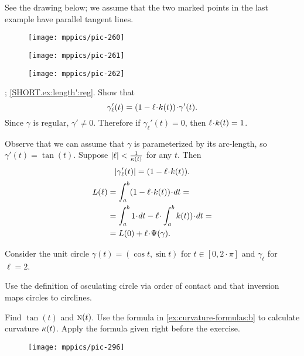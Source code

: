 See the drawing below; we assume that the two marked points in the last example have parallel tangent lines.

\begin{figure}[h!]
\begin{minipage}{.32\textwidth}
\centering
\texttt{[image: mppics/pic-260]}
\end{minipage}\hfill
\begin{minipage}{.32\textwidth}
\centering
\texttt{[image: mppics/pic-261]}
\end{minipage}
\hfill
\begin{minipage}{.32\textwidth}
\centering
\texttt{[image: mppics/pic-262]}
\end{minipage}
\end{figure}

\parbf{\ref{ex:length'}}; \ref{SHORT.ex:length':reg}.
Show that
\[
\gamma_\ell'(t)=(1-\ell\cdot\skur(t))\cdot \gamma'(t).
\]
Since $\gamma$ is regular, $\gamma'\ne0$.
Therefore if $\gamma_\ell'(t)=0$, then $\ell\cdot \skur(t)= 1$.

 Observe that we can assume that $\gamma$ is parameterized by its arc-length, so $\gamma'(t)=\tan(t)$.
Suppose $|\ell|<\frac{1}{\kappa(t)}$ for any $t$.
Then 
\[
|\gamma_\ell'(t)|=(1-\ell\cdot\skur(t)).
\]
\begin{align*}
L(\ell)
&=
\int_a^b(1-\ell\cdot\skur(t))\cdot dt=
\\
&=
\int_a^b 1\cdot dt-\ell\cdot \int_a^b\skur(t))\cdot dt=
\\
&=L(0)+\ell\cdot\Psi(\gamma).
\end{align*}



Consider the unit circle $\gamma(t)=(\cos t,\sin t)$ for $t\in[0,2\cdot\pi]$ and $\gamma_\ell$ for $\ell=2$.

Use the definition of osculating circle via order of contact and that inversion maps circles to circlines. 

Find $\tan(t)$ and $\textsc{n}(t)$.
Use the formula in \ref{ex:curvature-formulas:b} to calculate curvature $\kappa(t)$.
Apply the formula given right before the exercise.

\begin{wrapfigure}{r}{15 mm}
\vskip-0mm
\centering
\texttt{[image: mppics/pic-296]}
\vskip0mm
\end{wrapfigure}

